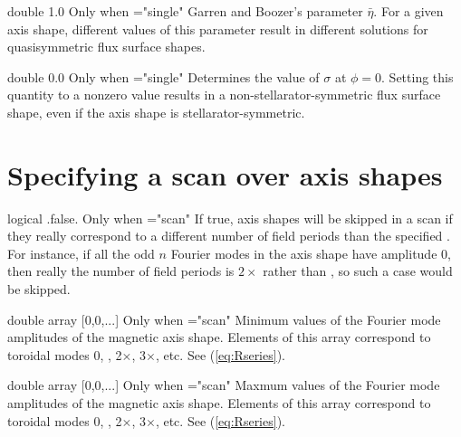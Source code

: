 \myhrule

{double}
{1.0}
{Only when ={\ttfamily "single"}}
{Garren and Boozer's parameter $\bar{\eta}$. For a given axis shape, different values of this parameter result in different solutions for quasisymmetric flux surface shapes.
}

\myhrule

{double}
{0.0}
{Only when ={\ttfamily "single"}}
{Determines the value of $\sigma$ at $\phi=0$. Setting this quantity to a nonzero value results in a non-stellarator-symmetric flux surface shape, even if the axis shape is stellarator-symmetric.
}

\myhrule


\section{Specifying a scan over axis shapes}

{logical}
{{\ttfamily .false.}}
{Only when ={\ttfamily "scan"}}
{If true, axis shapes will be skipped in a scan if they really correspond to a different number of field periods than the specified . For instance, if all the odd $n$ Fourier modes in the axis shape have amplitude 0, then really the number of field periods is $2\times$  rather than , so such a case would be skipped.}

\myhrule

{double array}
{[0,0,...]}
{Only when ={\ttfamily "scan"}}
{Minimum values of the Fourier mode amplitudes of the magnetic axis shape. Elements of this array correspond to toroidal modes 0, , 2$\times$, 3$\times$, etc.  See (\ref{eq:Rseries}).
}

\myhrule

{double array}
{[0,0,...]}
{Only when ={\ttfamily "scan"}}
{Maxmum values of the Fourier mode amplitudes of the magnetic axis shape. Elements of this array correspond to toroidal modes 0, , 2$\times$, 3$\times$, etc.  See (\ref{eq:Rseries}).
}

\myhrule

